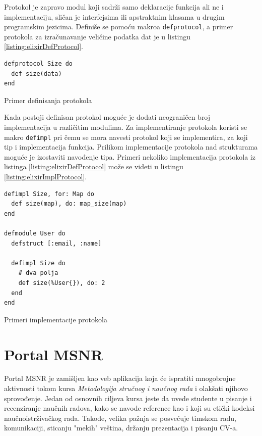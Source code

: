 \documentclass[12pt,oneside]{memoir}
\begin{document}
Protokol je zapravo modul koji sadrži samo deklaracije funkcija ali ne i implementaciju,
sličan je interfejsima ili apstraktnim klasama u drugim programskim jezicima. Definiše se
pomoću makroa \texttt{defprotocol}, a primer protokola za izračunavanje veličine podatka dat
je u listingu \ref{listing:elixirDefProtocol}.
\begin{listing}[!ht]
\begin{verbatim}
defprotocol Size do
  def size(data)
end
\end{verbatim}
\caption{Primer definisanja protokola}
\label{listing:elixirDefProtocol}
\end{listing}
Kada postoji definisan protokol moguće je dodati neograničen broj implementacija u
različitim modulima. Za implementiranje protokola koristi se makro \texttt{defimpl} pri čemu
se mora navesti protokol koji se implementira, za koji tip i implementacija funkcija.
Prilikom implementacije protokola nad strukturama moguće je izostaviti navođenje tipa.
Primeri nekoliko implementacija protokola iz listinga \ref{listing:elixirDefProtocol} može se videti u
listingu \ref{listing:elixirImplProtocol}.
\begin{listing}[!ht]
\begin{verbatim}
defimpl Size, for: Map do
  def size(map), do: map_size(map)
end

defmodule User do
  defstruct [:email, :name]

  defimpl Size do
    # dva polja
    def size(%User{}), do: 2
  end
end
\end{verbatim}
\caption{Primeri implementacije protokola}
\label{listing:elixirImplProtocol}
\end{listing}

\chapter{Portal MSNR}
Portal MSNR je zamišljen kao veb aplikacija koja će ispratiti mnogobrojne aktivnosti tokom kursa \emph{Metodologija stručnog i naučnog rada} i olakšati njihovo sprovođenje.
Jedan od osnovnih ciljeva kursa jeste da uvede studente u pisanje i recenziranje naučnih radova, kako se navode reference kao i koji su etički kodeksi naučnoistrživačkog rada.
Takođe, velika pažnja se posvećuje timskom radu, komunikaciji, sticanju "mekih" veština, držanju prezentacija i pisanju CV-a.
\end{document}
